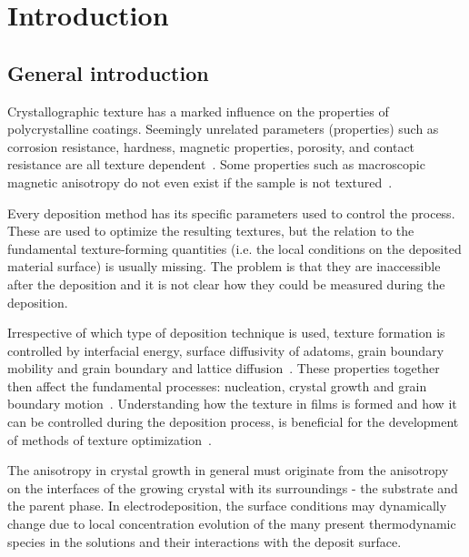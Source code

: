 \chapter{Introduction} \label{ch_introduction}


\section{General introduction}
Crystallographic texture has a marked influence on the properties of polycrystalline coatings. Seemingly unrelated parameters (properties) such as corrosion resistance, hardness, magnetic properties, porosity, and contact resistance are all texture dependent~\cite{Schlesinger2010}. Some properties such as macroscopic magnetic anisotropy do not even exist if the sample is not textured~\cite{Dinnebier2008}.

Every deposition method has its specific parameters used to control the process. These are used to optimize the resulting textures, but the relation to the fundamental texture-forming quantities (i.e. the local conditions on the deposited material surface) is usually missing. The problem is that they are inaccessible after the deposition and it is not clear how they could be measured during the deposition. 

Irrespective of which type of deposition technique is used, texture formation is controlled by interfacial energy, surface diffusivity of adatoms, grain boundary mobility and grain boundary and lattice diffusion~\cite{Szpunar1997, Suwas2014}. These properties together then affect the fundamental processes: nucleation, crystal growth and grain boundary motion~\cite{Barna1998}. Understanding how the texture in films is formed and how it can be controlled during the deposition process, is beneficial for the development of methods of texture optimization~\cite{Szpunar1997}. 

The anisotropy in crystal growth in general must originate from the anisotropy on the interfaces of the growing crystal with its surroundings - the substrate and the parent phase. In electrodeposition, the surface conditions may dynamically change due to local concentration evolution of the many present thermodynamic species in the solutions and their interactions with the deposit surface. 

